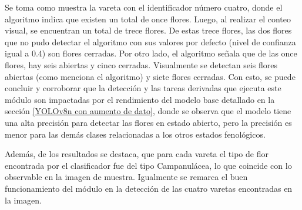 Se toma como muestra la vareta con el identificador número cuatro, donde el algoritmo indica que existen un total de once flores. Luego, al realizar el conteo visual, se encuentran un total de trece flores. De estas trece flores, las dos flores que no pudo detectar el algoritmo con sus valores por defecto (nivel de confianza igual a 0.4) son flores cerradas. Por otro lado, el algoritmo señala que de las once flores, hay seis abiertas y cinco cerradas. Visualmente se detectan seis flores abiertas (como menciona el algoritmo) y siete flores cerradas. Con esto, se puede concluir y corroborar que la detección y las tareas derivadas que ejecuta este módulo son impactadas por el rendimiento del modelo base detallado en la sección \ref{YOLOv8n con aumento de dato}, donde se observa que el modelo tiene una alta precisión para detectar las flores en estado abierto, pero la precisión es menor para las demás clases relacionadas a los otros estados fenológicos.

Además, de los resultados se destaca, que para cada vareta el tipo de flor encontrada por el clasificador fue del tipo Campanulácea, lo que coincide con lo observable en la imagen de muestra. Igualmente se remarca el buen funcionamiento del módulo en la detección de las cuatro varetas encontradas en la imagen.